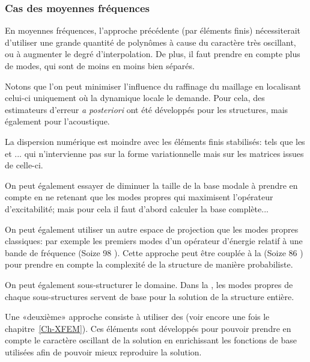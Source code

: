 \medskip
\subsubsection{Cas des moyennes fréquences}

En moyennes fréquences, l'approche précédente (par éléments finis) nécessiterait d'utiliser une grande quantité de polynômes à cause du caractère très oscillant, ou à augmenter le degré d'interpolation. De plus, il faut prendre en compte plus de modes, qui sont de moins en moins bien séparés.

\medskip
Notons que l'on peut minimiser l'influence du raffinage du maillage en localisant celui-ci uniquement où la dynamique locale le demande. Pour cela, des estimateurs d'erreur \emph{a posteriori} ont été développés pour les structures, mais également pour l'acoustique.

La dispersion numérique est moindre avec les éléments finis stabilisés: tels que les  et ... qui n'intervienne pas sur la forme variationnelle mais sur les matrices issues de celle-ci.

\medskip
On peut également essayer de diminuer la taille de la base modale à prendre en compte en ne retenant que les modes propres qui maximisent l'opérateur d'excitabilité; mais pour cela il faut d'abord calculer la base complète...

On peut également utiliser un autre espace de projection que les modes propres classiques: par exemple les premiers modes d'un opérateur d'énergie relatif à une bande de fréquence (Soize 98 \cite{bib-Soize98}). Cette approche peut être couplée à la  (Soize 86 \cite{bib-Soize86}) pour prendre en compte la complexité de la structure de manière probabiliste.

\medskip
On peut également sous-structurer le domaine. Dans la , les modes propres de chaque sous-structures servent de base pour la solution de la structure entière.

\bigskip
Une «deuxième» approche consiste à utiliser des  (voir encore une fois le chapitre~\ref{Ch-XFEM}). Ces éléments sont développés pour pouvoir prendre en compte le caractère oscillant de la solution en enrichissant les fonctions de base utilisées afin de pouvoir mieux reproduire la solution.


